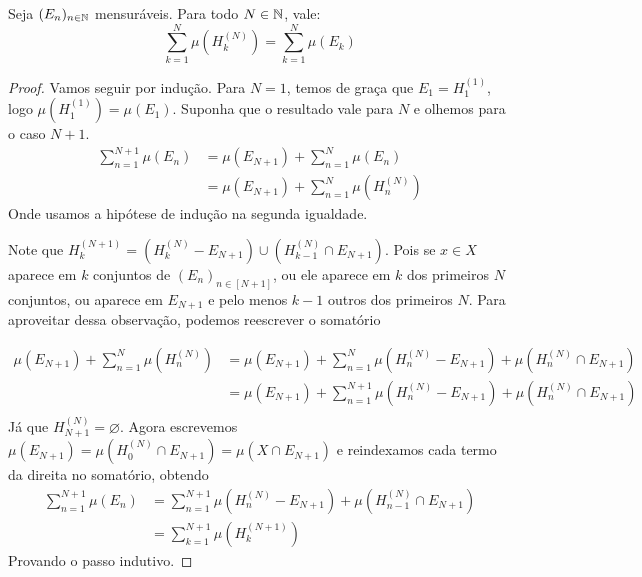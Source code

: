 \begin{lemma}
    \label{lemm:hk}
    Seja $(E_n)_{n \in \mathbb{N}}$ mensuráveis. Para todo $N \in \mathbb{N}$, vale:
    $$\sum_{k=1}^{N} \mu(H_k^{(N)}) = \sum_{k=1}^{N} \mu(E_k)$$
\end{lemma}
\begin{proof}
    Vamos seguir por indução. Para $N = 1$, temos de graça que $E_1 = H_1^{(1)}$, logo $\mu(H_1^{(1)}) = \mu(E_1)$.
    Suponha que o resultado vale para $N$ e olhemos para o caso $N+1$.
    \begin{align*}
        \sum_{n=1}^{N+1} \mu(E_n) &= \mu(E_{N+1}) + \sum_{n=1}^{N} \mu(E_n)\\
        &= \mu(E_{N+1}) + \sum_{n=1}^{N} \mu(H_n^{(N)})
    \end{align*}
    Onde usamos a hipótese de indução na segunda igualdade.

    Note que $H_k^{(N+1)} = (H_k^{(N)} - E_{N+1}) \cup (H_{k-1}^{(N)} \cap E_{N+1})$. Pois se $x \in X$ aparece em $k$ conjuntos de $(E_n)_{n \in [N+1]}$,
    ou ele aparece em $k$ dos primeiros $N$ conjuntos, ou aparece em $E_{N+1}$ e pelo menos $k-1$ outros dos primeiros $N$.
    Para aproveitar dessa observação, podemos reescrever o somatório

    \begin{align*}
        \mu(E_{N+1}) + \sum_{n=1}^{N} \mu(H_n^{(N)}) &= \mu(E_{N+1}) + \sum_{n=1}^{N} \mu(H_n^{(N)} - E_{N+1}) + \mu(H_n^{(N)} \cap E_{N+1})\\
        &= \mu(E_{N+1}) + \sum_{n=1}^{N+1} \mu(H_n^{(N)} - E_{N+1}) + \mu(H_n^{(N)} \cap E_{N+1})\\
    \end{align*}
    Já que $H_{N+1}^{(N)} = \varnothing$. Agora escrevemos $\mu(E_{N+1}) = \mu(H_0^{(N)} \cap E_{N+1}) = \mu(X \cap E_{N+1})$ e reindexamos 
    cada termo da direita no somatório, obtendo
    \begin{align*}
        \sum_{n=1}^{N+1} \mu(E_n) &= \sum_{n=1}^{N+1} \mu(H_n^{(N)} - E_{N+1}) + \mu(H_{n-1}^{(N)} \cap E_{N+1})\\
        &= \sum_{k=1}^{N+1} \mu(H_k^{(N+1)})
    \end{align*}
    Provando o passo indutivo.
\end{proof}

